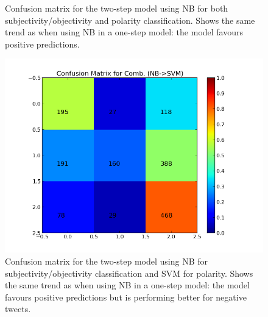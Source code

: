 \begin{minipage}[t!]{\linewidth}
\begin{minipage}{0.45\linewidth}
\begin{figure}[H]
           \caption[The confusion matrix for two-step NB -> NB]{Confusion matrix for the two-step model using NB for both subjectivity/objectivity and polarity classification. Shows the same trend as when using NB in a one-step model: the model favours positive predictions.}
           \label{fig:confmat_nb_nb}
          \end{figure}
     \end{minipage}
\end{minipage}

\begin{minipage}[t!]{\linewidth}
     \centering
     \begin{minipage}{0.45\linewidth}
          \begin{figure}[H]
               \includegraphics[width=\linewidth]{../img/plots/grid/confusion_matrix_Comb-NB-SVM.png}
           \caption[The confusion matrix for two-step NB -> SVM]{Confusion matrix for the two-step model using NB for subjectivity/objectivity classification and SVM for polarity. Shows the same trend as when using NB in a one-step model: the model favours positive predictions but is performing better for negative tweets.}
           \label{fig:confmat_nb_svm}
          \end{figure}
     \end{minipage}
     \hspace{0.05\linewidth}
     \begin{minipage}{0.45\linewidth}
          \begin{figure}[H]

\end{figure}
\end{minipage}
\end{minipage}
